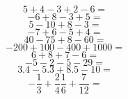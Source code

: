 \documentclass[11pt]{article}
\begin{document}
\begin{multicols}{2}

\begin{equation}
5+4-3+2-6 =
\end{equation}
\begin{equation}
-6+8-3+5 =
\end{equation}
\begin{equation}
5-10+8-3 =
\end{equation}
\begin{equation}
-7+6-5+4 =
\end{equation}
\begin{equation}
40-75+8-60=
\end{equation}
\begin{equation}
-200+100-400+1000 =
\end{equation}
\begin{equation}
6+8+7-6 =
\end{equation}
\begin{equation}
-5-2-5-29 =
\end{equation}
\begin{equation}
3.4-5.3+8.5-10 =
\end{equation}
\begin{equation}
-\frac{1}{3} + \frac{2}{4} \frac{1}{6} + \frac{7}{12} =
\end{equation}


\end{multicols}
    
\end{document}
